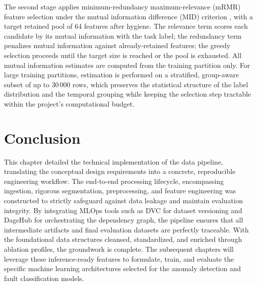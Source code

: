 The second stage applies minimum-redundancy maximum-relevance (mRMR) feature selection under the mutual information difference (MID) criterion \citep{peng2005mrmr}, with a target retained pool of 64 features after hygiene. The relevance term scores each candidate by its mutual information with the task label; the redundancy term penalizes mutual information against already-retained features; the greedy selection proceeds until the target size is reached or the pool is exhausted. All mutual information estimates are computed from the training partition only. For large training partitions, estimation is performed on a stratified, group-aware subset of up to 30\,000 rows, which preserves the statistical structure of the label distribution and the temporal grouping while keeping the selection step tractable within the project's computational budget.

\section{Conclusion}

This chapter detailed the technical implementation of the data pipeline, translating the conceptual design requirements into a concrete, reproducible engineering workflow. The end-to-end processing lifecycle, encompassing ingestion, rigorous segmentation, preprocessing, and feature engineering was constructed to strictly safeguard against data leakage and maintain evaluation integrity. By integrating MLOps tools such as DVC for dataset versioning and DagsHub for orchestrating the dependency graph, the pipeline ensures that all intermediate artifacts and final evaluation datasets are perfectly traceable. With the foundational data structures cleansed, standardized, and enriched through ablation profiles, the groundwork is complete. The subsequent chapters will leverage these inference-ready features to formulate, train, and evaluate the specific machine learning architectures selected for the anomaly detection and fault classification models.

